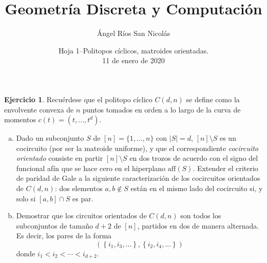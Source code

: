 \documentclass[10pt]{article}
\author{Ángel Ríos San Nicolás}
\title{Geometría Discreta y Computación}
\date{Hoja 1--Politopos cíclicos, matroides orientadas.\\11 de enero de 2020}
\theoremstyle{definition}
\newtheorem{ejer}{Ejercicio}
\begin{document}
\maketitle
\begin{ejer}Recuérdese que el politopo cíclico $C(d,n)$ se define como la envolvente convexa de $n$ puntos tomados en orden a lo largo de la curva de momentos $c(t)=(t,\ldots,t^d)$.
\begin{enumerate}[(a)]
\item Dado un subconjunto $S$ de $[n]=\{1,\ldots,n\}$ con $|S|=d$, $[n]\setminus S$ es un cocircuito (por ser la matroide uniforme), y que el correspondiente \textit{cocircuito orientado} consiste en partir $[n]\setminus S$ en dos trozos de acuerdo con el signo del funcional afín que se hace cero en el hiperplano $\text{aff}(S)$. Extender el criterio de paridad de Gale a la siguiente caracterización de los cocircuitos orientados de $C(d,n)$: dos elementos $a,b\notin S$ están en el mismo lado del cocircuito si, y solo si $[a,b]\cap S$ es par.
\item Demostrar que los circuitos orientados de $C(d,n)$ son todos los subconjuntos de tamaño $d+2$ de $[n]$, partidos en dos de manera alternada. Es decir, los pares de la forma $$\left(\left\{i_1,i_3,\ldots\right\},\left\{i_2,i_4,\ldots\right\}\right)$$
donde $i_1<i_2<\cdots<i_{d+2}.$
\end{enumerate}

\end{ejer}
\end{document}
